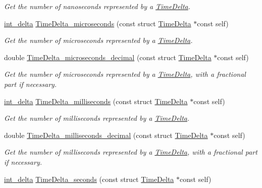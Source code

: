 \begin{DoxyCompactItemize}
\begin{DoxyCompactList}\small\item\em Get the number of nanoseconds represented by a \hyperlink{structTimeDelta}{Time\-Delta}. \end{DoxyCompactList}\item 
\hyperlink{types_8h_a8a67cf99971c5cfeeaa2380ba84a4c92}{int\-\_\-delta} \hyperlink{time-delta_8h_a64740843f3016de2bddd73ca40dc6465}{Time\-Delta\-\_\-microseconds} (const struct \hyperlink{structTimeDelta}{Time\-Delta} $\ast$const self)
\begin{DoxyCompactList}\small\item\em Get the number of microseconds represented by a \hyperlink{structTimeDelta}{Time\-Delta}. \end{DoxyCompactList}\item 
double \hyperlink{time-delta_8h_a7ded3314113cc38a3bc4034099f11ac1}{Time\-Delta\-\_\-microseconds\-\_\-decimal} (const struct \hyperlink{structTimeDelta}{Time\-Delta} $\ast$const self)
\begin{DoxyCompactList}\small\item\em Get the number of microseconds represented by a \hyperlink{structTimeDelta}{Time\-Delta}, with a fractional part if necessary. \end{DoxyCompactList}\item 
\hyperlink{types_8h_a8a67cf99971c5cfeeaa2380ba84a4c92}{int\-\_\-delta} \hyperlink{time-delta_8h_a7862999bc76772c28b49e682470c49da}{Time\-Delta\-\_\-milliseconds} (const struct \hyperlink{structTimeDelta}{Time\-Delta} $\ast$const self)
\begin{DoxyCompactList}\small\item\em Get the number of milliseconds represented by a \hyperlink{structTimeDelta}{Time\-Delta}. \end{DoxyCompactList}\item 
double \hyperlink{time-delta_8h_ac26e47832931d4fce592fbb6d49248aa}{Time\-Delta\-\_\-milliseconds\-\_\-decimal} (const struct \hyperlink{structTimeDelta}{Time\-Delta} $\ast$const self)
\begin{DoxyCompactList}\small\item\em Get the number of milliseconds represented by a \hyperlink{structTimeDelta}{Time\-Delta}, with a fractional part if necessary. \end{DoxyCompactList}\item 
\hyperlink{types_8h_a8a67cf99971c5cfeeaa2380ba84a4c92}{int\-\_\-delta} \hyperlink{time-delta_8h_ac63d87ff8c98e5659dd3984b2e4cb180}{Time\-Delta\-\_\-seconds} (const struct \hyperlink{structTimeDelta}{Time\-Delta} $\ast$const self)

\end{DoxyCompactItemize}
